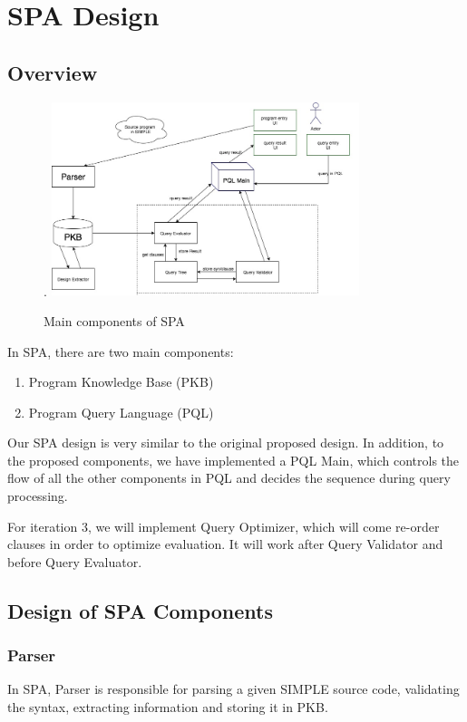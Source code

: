 \documentclass[12pt]{article}
\begin{document}
\section{SPA Design}
\subsection{Overview}
\begin{figure}[!htb].
\centering
\includegraphics[width=0.8\textwidth]{Architecture_Diagram.jpg}
\caption{\label{fig:Architecture}Main components of SPA}
\end{figure}
In  SPA, there are two main components:
\begin{enumerate}
\item Program Knowledge Base (PKB)
\item Program Query Language (PQL)
\end{enumerate}

Our SPA design is very similar to the original proposed design. In addition, to the proposed components, we have implemented a PQL Main, which controls the flow of all the other components in PQL and decides the sequence during query processing.

For iteration 3, we will implement Query Optimizer, which will come re-order clauses in order to optimize evaluation. It will work after Query Validator and before Query Evaluator.

\subsection{Design of SPA Components}

\subsubsection{Parser }
In SPA, Parser is responsible for parsing a given SIMPLE source code, validating the syntax, extracting information and storing it in PKB.
\end{document}
